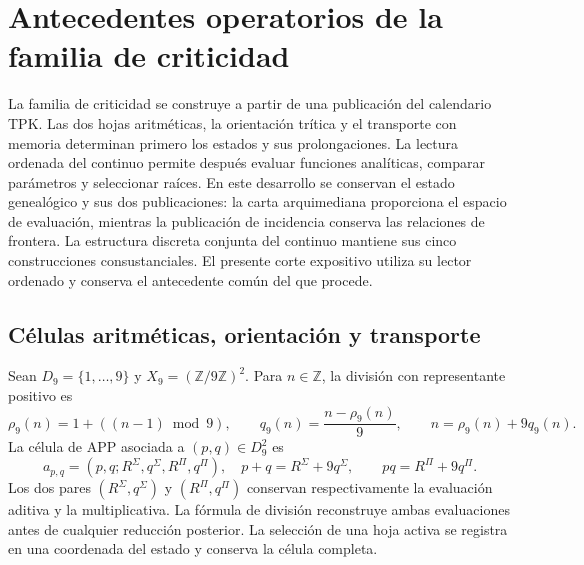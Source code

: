 \providecommand{\ZZ}{\mathbb Z}
\providecommand{\RR}{\mathbb R}
\providecommand{\FF}{\mathbb F}
\providecommand{\APP}{\mathrm{APP}}
\providecommand{\TPK}{\mathrm{TPK}}
\providecommand{\TRIT}{\{-1,0,+1\}}

\section{Antecedentes operatorios de la familia de criticidad}
\label{hmtfg:antecedentes-operatorios}

La familia de criticidad se construye a partir de una publicación del
calendario TPK. Las dos hojas aritméticas, la orientación trítica y el
transporte con memoria determinan primero los estados y sus prolongaciones.
La lectura ordenada del continuo permite después evaluar funciones
analíticas, comparar parámetros y seleccionar raíces. En este desarrollo
se conservan el estado genealógico y sus dos publicaciones: la carta
arquimediana proporciona el espacio de evaluación, mientras la publicación
de incidencia conserva las relaciones de frontera. La estructura discreta
conjunta del continuo mantiene sus cinco construcciones consustanciales.
El presente corte expositivo utiliza su lector ordenado y conserva el
antecedente común del que procede.

\subsection{Células aritméticas, orientación y transporte}
\label{hmtfg:app-trit-transporte}

Sean \(D_9=\{1,\ldots,9\}\) y \(X_9=(\ZZ/9\ZZ)^2\). Para
\(n\in\ZZ\), la división con representante positivo es
\[
 \rho_9(n)=1+((n-1)\bmod9),\qquad
 q_9(n)=\frac{n-\rho_9(n)}9,\qquad
 n=\rho_9(n)+9q_9(n).
\]
La célula de APP asociada a \((p,q)\in D_9^2\) es
\[
 a_{p,q}=(p,q;R^\Sigma,q^\Sigma,R^\Pi,q^\Pi),
 \quad
 p+q=R^\Sigma+9q^\Sigma,\qquad
 pq=R^\Pi+9q^\Pi.
\]
Los dos pares \((R^\Sigma,q^\Sigma)\) y \((R^\Pi,q^\Pi)\)
conservan respectivamente la evaluación aditiva y la multiplicativa.
La fórmula de división reconstruye ambas evaluaciones antes de cualquier
reducción posterior. La selección de una hoja activa se registra en una
coordenada del estado y conserva la célula completa.

